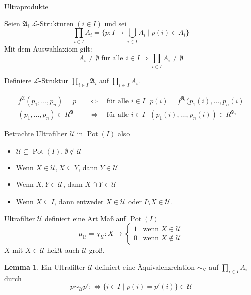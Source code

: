 \documentclass[12pt,parskip=full]{scrartcl}
\newcommand{\heading}{\underline}
\theoremstyle{definition}
\newtheorem{lemma}[theorem]{Lemma}
\begin{document}
	\heading{Ultraprodukte}

	Seien $\mathfrak{A}_i$ $\mathcal{L}$-Strukturen $(i \in I)$ und sei
	\begin{equation*}
		\prod_{i \in I} A_i = \{ p: I \to \bigcup_{i \in I} A_i \mid p(i) \in A_i \}
	\end{equation*}
	Mit dem Auswahlaxiom gilt:
	\begin{equation*}
		A_i \neq \emptyset \text{ für alle $i \in I$} \Rightarrow \prod_{i \in I} A_i \neq \emptyset
	\end{equation*}
	
	Definiere $\mathcal{L}$-Struktur $\prod_{i \in I} \mathfrak{A}_i$ auf $\prod_{i \in I} A_i$.
	
	\begin{align*}
		f^\mathfrak{A}(p_1, \dots, p_n) = p \quad&\Leftrightarrow\quad \text{für alle $i \in I$ } p(i) =  f^{\mathfrak{A}_i}(p_1(i), \dots, p_n(i) \\
		(p_1, \dots, p_n) \in R^\mathfrak{A} \quad&\Leftrightarrow\quad \text{für alle $i \in I$ } (p_1(i), \dots, p_n(i)) \in R^{\mathfrak{A}_i}
	\end{align*}
	
	Betrachte Ultrafilter $\mathcal{U}$ in $\operatorname{Pot}(I)$ also
	\begin{itemize}
		\item $\mathcal{U} \subsetneq \operatorname{Pot}(I), \emptyset \notin \mathcal{U}$
		\item Wenn $X \in \mathcal{U}, X \subseteq Y$, dann $Y \in \mathcal{U}$
		\item Wenn $X,Y \in \mathcal{U}$, dann $X \cap Y \in \mathcal{U}$
		\item Wenn $X \subseteq I$, dann entweder $X \in \mathcal{U}$ oder $I \setminus X \in \mathcal{U}$.
	\end{itemize}

	Ultrafilter $\mathcal{U}$ definiert eine Art Maß auf $\operatorname{Pot}(I)$
	\begin{equation*}
		\mu_\mathcal{U} = \chi_\mathcal{U}: X \mapsto \begin{cases}
			1 & \text{wenn $X \in \mathcal{U}$} \\
			0 & \text{wenn $X \notin \mathcal{U}$}
		\end{cases}
	\end{equation*}
	$X$ mit $X \in \mathcal{U}$ heißt auch $\mathcal{U}$-groß.
	
	\begin{lemma}
		Ein Ultrafilter $\mathcal{U}$ definiert eine Äquivalenzrelation $\sim_\mathcal{U}$ auf $\prod_{i \in I} A_i$ durch
		\begin{equation*}
			p \sim_\mathcal{U} p' :\Leftrightarrow \{ i \in I \mid p(i) = p'(i) \} \in \mathcal{U}
		\end{equation*}
	\end{lemma}
\end{document}
